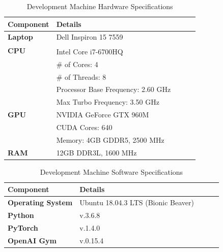\begin{table}[!h]
	\centering
	\caption{Development Machine Hardware Specifications}
	\label{table:hw_spec}
	\begin{tabular}{@{}lllll@{}}
		\toprule
		\textbf{Component} & \textbf{Details}                                                                      \\
		\midrule
		\textbf{Laptop}    & Dell Inspiron 15 7559                                                                 \\\midrule
		\textbf{CPU}       & Intel\textsuperscript{\textregistered} Core\textsuperscript{\texttrademark} i7-6700HQ \\
		                   & \# of Cores: 4                                                                        \\
		                   & \# of Threads: 8                                                                      \\
		                   & Processor Base Frequency: 2.60 GHz                                                    \\
		                   & Max Turbo Frequency: 3.50 GHz                                                         \\\midrule
		\textbf{GPU}       & NVIDIA GeForce GTX 960M                                                               \\
		                   & CUDA Cores: 640                                                                       \\
		                   & Memory: 4GB GDDR5, 2500 MHz                                                           \\\midrule
		\textbf{RAM}       & 12GB DDR3L, 1600 MHz                                                                  \\
		\bottomrule
	\end{tabular}
\end{table}

\begin{table}[!h]
	\centering
	\caption{Development Machine Software Specifications}
	\label{table:sw_spec}
	\begin{tabular}{@{}lllll@{}}
		\toprule
		\textbf{Component}        & \textbf{Details}                   \\
		\midrule
		\textbf{Operating System} & Ubuntu 18.04.3 LTS (Bionic Beaver) \\\midrule
		\textbf{Python}           & v.3.6.8                            \\\midrule
		\textbf{PyTorch}          & v.1.4.0                            \\\midrule
		\textbf{OpenAI Gym}       & v.0.15.4                           \\
		\bottomrule
	\end{tabular}
\end{table}

